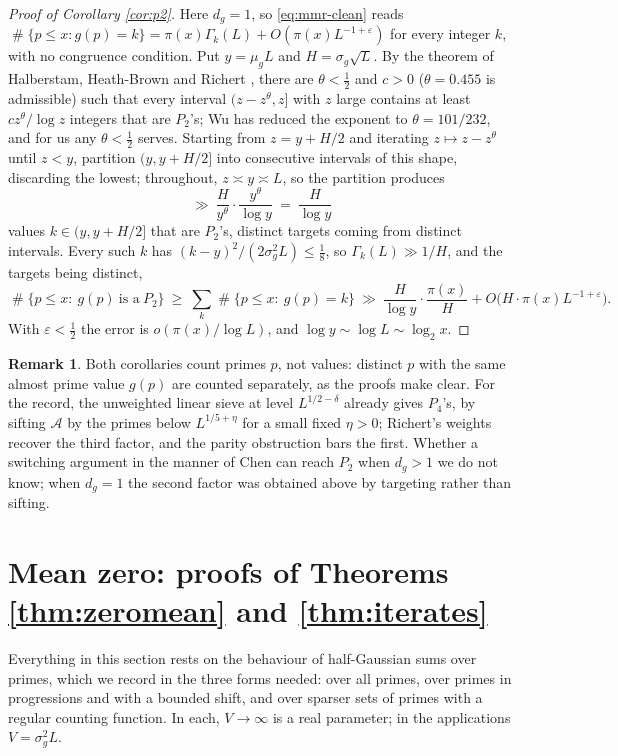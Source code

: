 \documentclass[11pt,reqno]{amsart}
\theoremstyle{plain}
\theoremstyle{definition}
\newtheorem{remark}[theorem]{Remark}
\DeclareMathOperator{\Card}{\#}
\begin{document}
\begin{proof}[Proof of Corollary \ref{cor:p2}]
Here $d_g=1$, so \eqref{eq:mmr-clean} reads $\Card\{p\le x: g(p)=k\}=\pi(x)\Gamma_k(L)+O(\pi(x)L^{-1+\varepsilon})$ for every integer $k$, with no congruence condition. Put $y=\mu_gL$ and $H=\sigma_g\sqrt L$. By the theorem of Halberstam, Heath-Brown and Richert \cite{hhbr}, there are $\theta<\tfrac12$ and $c>0$ ($\theta=0.455$ is admissible) such that every interval $(z-z^{\theta},z]$ with $z$ large contains at least $cz^{\theta}/\log z$ integers that are $P_2$'s; Wu \cite{wu} has reduced the exponent to $\theta=101/232$, and for us any $\theta<\tfrac12$ serves. Starting from $z=y+H/2$ and iterating $z\mapsto z-z^{\theta}$ until $z<y$, partition $(y,y+H/2]$ into consecutive intervals of this shape, discarding the lowest; throughout, $z\asymp y\asymp L$, so the partition produces
\[
\ \gg\ \frac{H}{y^{\theta}}\cdot\frac{y^{\theta}}{\log y}\ =\ \frac{H}{\log y}
\]
values $k\in(y,y+H/2]$ that are $P_2$'s, distinct targets coming from distinct intervals. Every such $k$ has $(k-y)^{2}/(2\sigma_g^{2}L)\le\tfrac18$, so $\Gamma_k(L)\gg1/H$, and the targets being distinct,
\[
\Card\{p\le x:\ g(p)\ \text{is a}\ P_2\}\ \ge\ \sum_{k}\Card\{p\le x:\ g(p)=k\}
\ \gg\ \frac{H}{\log y}\cdot\frac{\pi(x)}H+O\big(H\cdot\pi(x)L^{-1+\varepsilon}\big).
\]
With $\varepsilon<\tfrac12$ the error is $o(\pi(x)/\log L)$, and $\log y\sim\log L\sim\log_2x$.
\end{proof}

\begin{remark}
Both corollaries count primes $p$, not values: distinct $p$ with the same almost prime value $g(p)$ are counted separately, as the proofs make clear. For the record, the unweighted linear sieve at level $L^{1/2-\delta}$ already gives $P_4$'s, by sifting $\mathcal A$ by the primes below $L^{1/5+\eta}$ for a small fixed $\eta>0$; Richert's weights recover the third factor, and the parity obstruction bars the first. Whether a switching argument in the manner of Chen can reach $P_2$ when $d_g>1$ we do not know; when $d_g=1$ the second factor was obtained above by targeting rather than sifting.
\end{remark}
\section{Mean zero: proofs of Theorems \ref{thm:zeromean} and \ref{thm:iterates}}\label{sec:zeromean}

Everything in this section rests on the behaviour of half-Gaussian sums over primes, which we record in the three forms needed: over all primes, over primes in progressions and with a bounded shift, and over sparser sets of primes with a regular counting function. In each, $V\to\infty$ is a real parameter; in the applications $V=\sigma_g^{2}L$.
\end{document}
